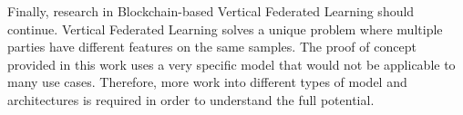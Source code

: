 Finally, research in Blockchain-based Vertical Federated Learning should continue. Vertical Federated Learning solves a unique problem where multiple parties have different features on the same samples. The proof of concept provided in this work uses a very specific model that would not be applicable to many use cases. Therefore, more work into different types of model and architectures is required in order to understand the full potential.
